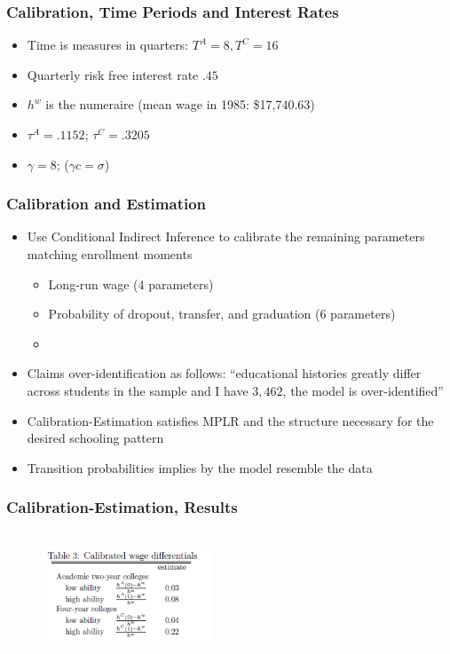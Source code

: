 \begin{frame}
	\frametitle{Calibration, Time Periods and Interest Rates}
		\begin{itemize}
		\item Time is measures in quarters: $T^A = 8, T^C = 16$
		\item Quarterly risk free interest rate $.45$
		\item $h^w$ is the numeraire (mean wage in 1985: \$17,740.63)
		\item $\tau^A = .1152$; $\tau^C = .3205$
		\item $\gamma = 8$; ($\gamma c = \sigma$)
		\end{itemize}
\end{frame}

\begin{frame}
	\frametitle{Calibration and Estimation}
		\begin{itemize}
			\item Use Conditional Indirect Inference to calibrate the remaining parameters matching enrollment moments
				\begin{itemize}
					\item Long-run wage (4 parameters)
					\item Probability of dropout, transfer, and graduation (6 parameters)
					\item
				\end{itemize}
			\item Claims over-identification as follows: ``educational histories greatly differ across students in the sample and I have $3,462$, the model is over-identified''
			\item Calibration-Estimation satisfies MPLR and the structure necessary for the desired schooling pattern
			\item Transition probabilities implies by the model resemble the data
		\end{itemize}
\end{frame}

\begin{frame}
	\frametitle{Calibration-Estimation, Results}
			\begin{figure}[H] 
				\caption*{}
				\centering
				\includegraphics[width=2in, height=1.5in]{Figures/T/table3.png}
		\end{figure}
\end{frame}

